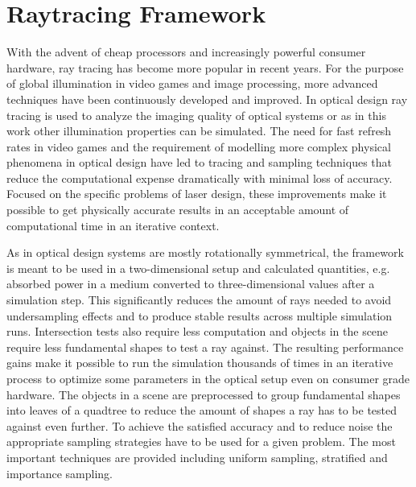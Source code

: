 \documentclass[a4paper,10pt]{article}
\begin{document}
    \section{Raytracing Framework} \label{sec:raytracing}
    With the advent of cheap processors and increasingly powerful 
    consumer hardware, ray tracing has become more popular in
    recent years.
    For the purpose of global illumination in video games and image
    processing, more advanced techniques have been continuously
    developed and improved.
    In optical design ray tracing is used to analyze the imaging 
    quality of optical systems or as in this work other 
    illumination properties can be simulated.
    The need for fast refresh rates in video games and the requirement
    of modelling more complex physical phenomena in optical design
    have led to tracing and sampling techniques that reduce the
    computational expense dramatically with minimal loss of accuracy. 
    Focused on the specific problems of laser design, these
    improvements make it possible to get physically accurate results
    in an acceptable amount of computational time in an iterative
    context.

    As in optical design systems are mostly rotationally symmetrical,
    the framework is meant to be used in a two-dimensional setup
    and calculated quantities, e.g. absorbed power in a medium 
    converted to three-dimensional values after a simulation step.
    This significantly reduces the amount of rays needed to avoid
    undersampling effects and to produce stable results across multiple
    simulation runs.
    Intersection tests also require less computation and objects in the
    scene require less fundamental shapes to test a ray against.
    The resulting performance gains make it possible to run the 
    simulation thousands of times in an iterative process to 
    optimize some parameters in the optical setup even on consumer
    grade hardware.
    The objects in a scene are preprocessed to group fundamental shapes
    into leaves of a quadtree to reduce the amount of shapes a ray has
    to be tested against even further.
    To achieve the satisfied accuracy and to reduce noise the appropriate
    sampling strategies have to be used for a given problem.
    The most important techniques are provided including 
    uniform sampling, stratified and importance sampling.
    
\end{document}

